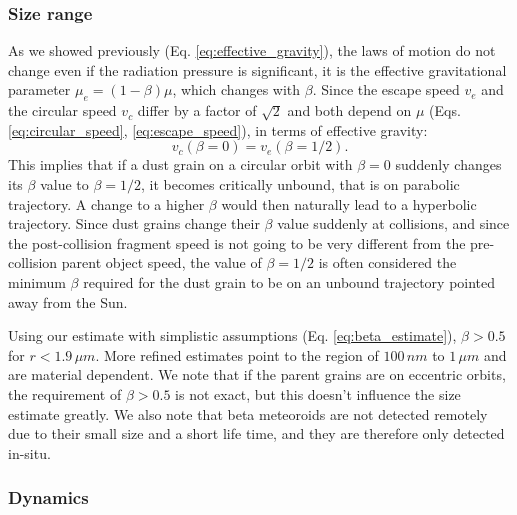 \subsubsection{Size range}

As we showed previously (Eq. \ref{eq:effective_gravity}), the laws of motion do not change even if the radiation pressure is significant, it is the effective gravitational parameter $\mu_{e} = (1-\beta) \mu$, which changes with $\beta$. Since the escape speed $v_e$ and the circular speed $v_c$ differ by a factor of $\sqrt{2}$ and both depend on $\mu$ (Eqs. \ref{eq:circular_speed}, \ref{eq:escape_speed}), in terms of effective gravity:
\begin{equation}
    v_c(\beta=0) = v_e(\beta=1/2).
\end{equation}
This implies that if a dust grain on a circular orbit with $\beta=0$ suddenly changes its $\beta$ value to $\beta = 1/2$, it becomes critically unbound, that is on parabolic trajectory. A change to a higher $\beta$ would then naturally lead to a hyperbolic trajectory. Since dust grains change their $\beta$ value suddenly at collisions, and since the post-collision fragment speed is not going to be very different from the pre-collision parent object speed, the value of $\beta=1/2$ is often considered the minimum $\beta$ required for the dust grain to be on an unbound trajectory pointed away from the Sun.

Using our estimate with simplistic assumptions (Eq. \ref{eq:beta_estimate}), $\beta > 0.5$ for $r < 1.9 \, \si{\mu m}$. More refined estimates \citep{kimura2003composition} point to the region of $100 \, \si{nm}$ to $1 \, \si{\mu m}$ and are material dependent. We note that if the parent grains are on eccentric orbits, the requirement of $\beta > 0.5$ is not exact, but this doesn't influence the size estimate greatly. We also note that beta meteoroids are not detected remotely due to their small size and a short life time, and they are therefore only detected in-situ.

\subsubsection{Dynamics}

